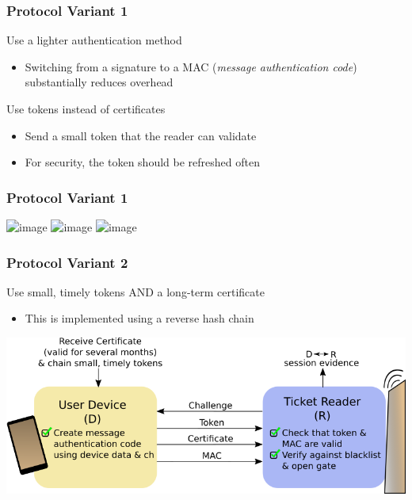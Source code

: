 \documentclass[unknownkeysallowed]{beamer}
\begin{document}
\begin{frame}
\frametitle{Protocol Variant 1}
  \begin{center}
    \begin{block}{Use a lighter authentication method}
      \begin{itemize}
        \pause
        \item{Switching from a signature to a MAC (\textit{message authentication code}) substantially reduces overhead}
        \pause
      \end{itemize}
    \end{block}
    \begin{block}{Use tokens instead of certificates}
      \begin{itemize}
        \pause
        \item{Send a small token that the reader can validate}
        \item{For security, the token should be refreshed often}
      \end{itemize}
    \end{block}
  \end{center}
\end{frame}

\begin{frame}
\frametitle{Protocol Variant 1}
\begin{center}
  \includegraphics<1>[width=.8\linewidth,height=.8\textheight,keepaspectratio]{figures/ticketing/protocol45.png}
  \includegraphics<2>[width=.8\linewidth,height=.8\textheight,keepaspectratio]{figures/ticketing/protocol50.png}
  \includegraphics<3>[width=.8\linewidth,height=.8\textheight,keepaspectratio]{figures/ticketing/protocol55.png}
\end{center}
\end{frame}

\begin{frame}
\frametitle{Protocol Variant 2}
  \begin{center}
    \begin{block}{Use small, timely tokens AND a long-term certificate}
      \begin{itemize}
        \pause
        \item{This is implemented using a reverse hash chain}
      \end{itemize}
    \end{block}
    \includegraphics[width=.8\linewidth,height=.8\textheight,keepaspectratio]{figures/ticketing/protocol60.png}
  \end{center}
\end{frame}
\end{document}
